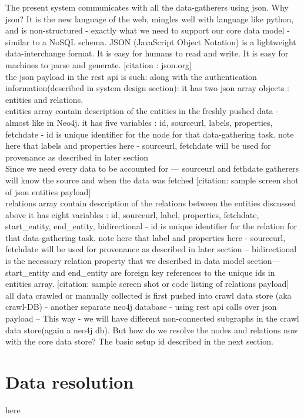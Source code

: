 The present system communicates with all the data-gatherers using json. Why json? It is the new language of the web, mingles well with language like python, and is non-structured - exactly what we need to support our core data model - similar to a NoSQL schema. JSON (JavaScript Object Notation) is a lightweight data-interchange format. It is easy for humans to read and write. It is easy for machines to parse and generate. [citation : json.org]   \\

the json payload in the rest api is such: along with the authentication information(described in system design section): it has two json array objects : entities and relations. \\

entities array contain description of the entities in the freshly pushed data - almost like in Neo4j. 
it has five variables : id, sourceurl, labels, properties, fetchdate - id is unique identifier for the node for that data-gathering task. note here that labels and properties here  - sourceurl, fetchdate will be used for provenance as described in later section \\


Since we need every data to be accounted for ---  sourceurl and fethdate
gatherers will know the source and when the data was fetched 
[citation: sample screen shot of json entities payload] \\

relations array contain description of the relations between the entities discussed above 
it has eight variables : id, sourceurl, label, properties, fetchdate, start\_entity, end\_entity, bidirectional - id is unique identifier for the relation for that data-gathering task. note here that label and properties here  - sourceurl, fetchdate will be used for provenance as described in later section -- bidirectional is the necessary relation property that we described in data model section---start\_entity and end\_entity are foreign key references to the unique ids in entities array.  
[citation: sample screen shot or code listing of relations payload] \\

all data crawled or manually collected is first pushed into crawl data store (aka crawl-DB) -  another separate neo4j database -  using rest api calls over json payload -- 
This way - we will have different non-connected subgraphs in the crawl data store(again a neo4j db).  
But how do we resolve the nodes and relations now with the core data store? The basic setup id described in the next section. \\


\section{Data resolution}

here